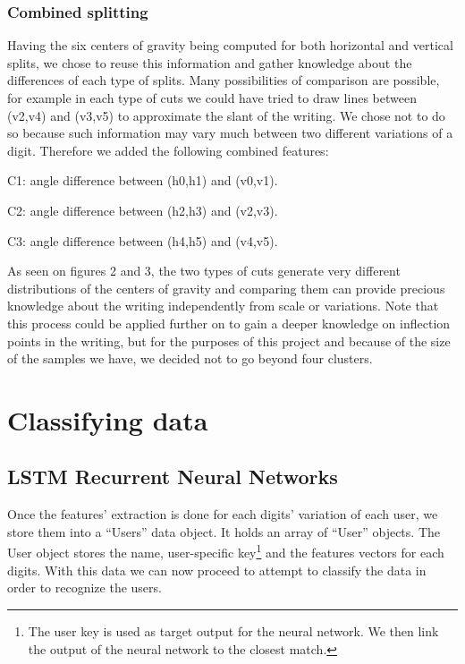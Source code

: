\documentclass[a4paper]{article}
\begin{document}
{\subsubsection{Combined splitting}

Having the six centers of gravity being computed for both horizontal and vertical splits, we chose to reuse this information and gather knowledge about the differences of each type of splits. Many possibilities of comparison are possible, for example in each type of cuts we could have tried to draw lines between (v2,v4) and (v3,v5) to approximate the slant of the writing. We chose not to do so because such information may vary much between two different variations of a digit. Therefore we added the following combined features:

\begin{listCustom}
	\item C1: angle difference between (h0,h1) and (v0,v1).
	\item C2: angle difference between (h2,h3) and (v2,v3).
	\item C3: angle difference between (h4,h5) and (v4,v5).
\end{listCustom}

As seen on figures 2 and 3, the two types of cuts generate very different distributions of the centers of gravity and comparing them can provide precious knowledge about the writing independently from scale or variations. Note that this process could be applied further on to gain a deeper knowledge on inflection points in the writing, but for the purposes of this project and because of the size of the samples we have, we decided not to go beyond four clusters.

\section{Classifying data}
\subsection{LSTM Recurrent Neural Networks}

Once the features’ extraction is done for each digits’ variation of each user, we store them into a “Users” data object. It holds an array of “User” objects. The User object stores the name, user-specific key\footnote{The user key is used as target output for the neural network. We then link the output of the neural network to the closest match.} and the features vectors for each digits. With this data we can now proceed to attempt to classify the data in order to recognize the users.\\

}
\end{document}

